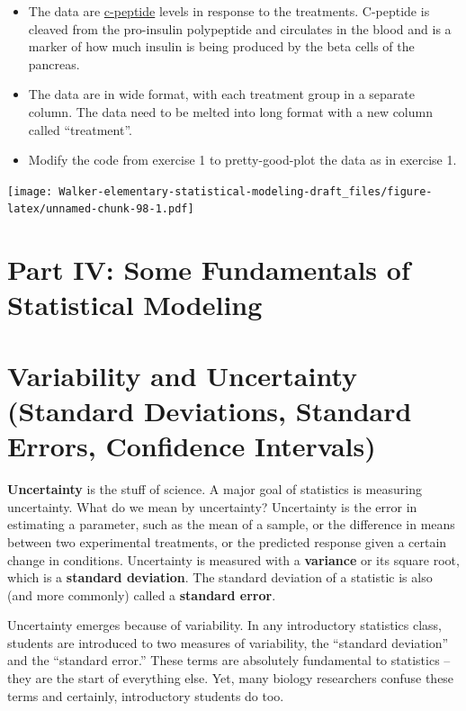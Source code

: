 \documentclass[]{book}
\providecommand{\tightlist}{%
  \setlength{\itemsep}{0pt}\setlength{\parskip}{0pt}}
\begin{document}
\begin{itemize}
\tightlist
\item
  The data are \href{https://en.wikipedia.org/wiki/C-peptide}{c-peptide} levels in response to the treatments. C-peptide is cleaved from the pro-insulin polypeptide and circulates in the blood and is a marker of how much insulin is being produced by the beta cells of the pancreas.
\item
  The data are in wide format, with each treatment group in a separate column. The data need to be melted into long format with a new column called ``treatment''.
\item
  Modify the code from exercise 1 to pretty-good-plot the data as in exercise 1.
\end{itemize}

\texttt{[image: Walker-elementary-statistical-modeling-draft\_files/figure-latex/unnamed-chunk-98-1.pdf]}

\hypertarget{part-iv-some-fundamentals-of-statistical-modeling}{%
\chapter*{Part IV: Some Fundamentals of Statistical Modeling}\label{part-iv-some-fundamentals-of-statistical-modeling}}

\hypertarget{variability-and-uncertainty-standard-deviations-standard-errors-confidence-intervals}{%
\chapter{Variability and Uncertainty (Standard Deviations, Standard Errors, Confidence Intervals)}\label{variability-and-uncertainty-standard-deviations-standard-errors-confidence-intervals}}

\textbf{Uncertainty} is the stuff of science. A major goal of statistics is measuring uncertainty. What do we mean by uncertainty? Uncertainty is the error in estimating a parameter, such as the mean of a sample, or the difference in means between two experimental treatments, or the predicted response given a certain change in conditions. Uncertainty is measured with a \textbf{variance} or its square root, which is a \textbf{standard deviation}. The standard deviation of a statistic is also (and more commonly) called a \textbf{standard error}.

Uncertainty emerges because of variability. In any introductory statistics class, students are introduced to two measures of variability, the ``standard deviation'' and the ``standard error.'' These terms are absolutely fundamental to statistics -- they are the start of everything else. Yet, many biology researchers confuse these terms and certainly, introductory students do too.
\end{document}
